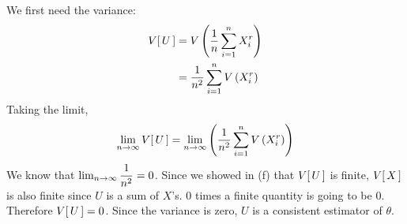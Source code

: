 We first need the variance:
\begin{align*}
    V [ \,{U}\, ] &= V \left( {\frac{1}{{n}} \sum_{i=1}^n X_i^r} \right)\\
    &= \frac{1}{{n^2}} \sum_{i=1}^{n} V \left( {X_i^r} \right)\\
\end{align*}
Taking the limit,
$$\lim_{n\to\infty} V [ \,{U}\, ] = \lim_{n\to\infty} \left( {\frac{1}{{n^2}} \sum_{i=1}^n V \left( {X_i^r} \right)} \right)$$
We know that $\lim_{n\to\infty} \dfrac{1}{n^2} = 0$. Since we showed in (f) that $V [ \,{U}\, ]$ is finite, $V [ \,{X}\, ]$ is also finite since $U$ is a sum of $X$'s. 0 times a finite quantity is going to be 0. Therefore $V [ \,{U}\, ] = 0$. Since the variance is zero, $U$ is a consistent estimator of $\theta$.